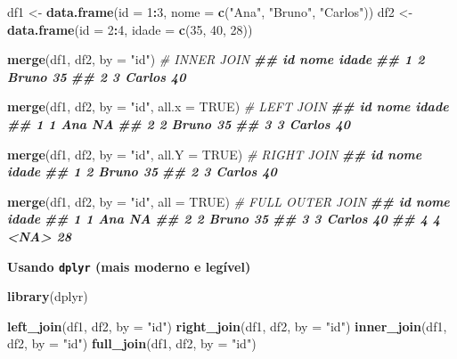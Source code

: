 \documentclass[
]{book}
\newenvironment{Shaded}{\begin{snugshade}}{\end{snugshade}}
\newcommand{\AttributeTok}[1]{\textcolor[rgb]{0.13,0.29,0.53}{#1}}
\newcommand{\CommentTok}[1]{\textcolor[rgb]{0.56,0.35,0.01}{\textit{#1}}}
\newcommand{\ConstantTok}[1]{\textcolor[rgb]{0.56,0.35,0.01}{#1}}
\newcommand{\DecValTok}[1]{\textcolor[rgb]{0.00,0.00,0.81}{#1}}
\newcommand{\DocumentationTok}[1]{\textcolor[rgb]{0.56,0.35,0.01}{\textbf{\textit{#1}}}}
\newcommand{\FunctionTok}[1]{\textcolor[rgb]{0.13,0.29,0.53}{\textbf{#1}}}
\newcommand{\NormalTok}[1]{#1}
\newcommand{\OtherTok}[1]{\textcolor[rgb]{0.56,0.35,0.01}{#1}}
\newcommand{\SpecialCharTok}[1]{\textcolor[rgb]{0.81,0.36,0.00}{\textbf{#1}}}
\newcommand{\StringTok}[1]{\textcolor[rgb]{0.31,0.60,0.02}{#1}}
\begin{document}
\begin{Shaded}
\begin{Highlighting}[]
\NormalTok{df1 }\OtherTok{\textless{}{-}} \FunctionTok{data.frame}\NormalTok{(}\AttributeTok{id =} \DecValTok{1}\SpecialCharTok{:}\DecValTok{3}\NormalTok{, }\AttributeTok{nome =} \FunctionTok{c}\NormalTok{(}\StringTok{"Ana"}\NormalTok{, }\StringTok{"Bruno"}\NormalTok{, }\StringTok{"Carlos"}\NormalTok{))}
\NormalTok{df2 }\OtherTok{\textless{}{-}} \FunctionTok{data.frame}\NormalTok{(}\AttributeTok{id =} \DecValTok{2}\SpecialCharTok{:}\DecValTok{4}\NormalTok{, }\AttributeTok{idade =} \FunctionTok{c}\NormalTok{(}\DecValTok{35}\NormalTok{, }\DecValTok{40}\NormalTok{, }\DecValTok{28}\NormalTok{))}

\FunctionTok{merge}\NormalTok{(df1, df2, }\AttributeTok{by =} \StringTok{"id"}\NormalTok{)  }\CommentTok{\# INNER JOIN}
\DocumentationTok{\#\#   id   nome idade}
\DocumentationTok{\#\# 1  2  Bruno    35}
\DocumentationTok{\#\# 2  3 Carlos    40}

\FunctionTok{merge}\NormalTok{(df1, df2, }\AttributeTok{by =} \StringTok{"id"}\NormalTok{, }\AttributeTok{all.x =} \ConstantTok{TRUE}\NormalTok{) }\CommentTok{\# LEFT JOIN}
\DocumentationTok{\#\# id   nome idade}
\DocumentationTok{\#\# 1  1    Ana    NA}
\DocumentationTok{\#\# 2  2  Bruno    35}
\DocumentationTok{\#\# 3  3 Carlos    40}

\FunctionTok{merge}\NormalTok{(df1, df2, }\AttributeTok{by =} \StringTok{"id"}\NormalTok{, }\AttributeTok{all.Y =} \ConstantTok{TRUE}\NormalTok{) }\CommentTok{\# RIGHT JOIN}
\DocumentationTok{\#\#   id   nome idade}
\DocumentationTok{\#\# 1  2  Bruno    35}
\DocumentationTok{\#\# 2  3 Carlos    40}

\FunctionTok{merge}\NormalTok{(df1, df2, }\AttributeTok{by =} \StringTok{"id"}\NormalTok{, }\AttributeTok{all =} \ConstantTok{TRUE}\NormalTok{) }\CommentTok{\# FULL OUTER JOIN}
\DocumentationTok{\#\#   id   nome idade}
\DocumentationTok{\#\# 1  1    Ana    NA}
\DocumentationTok{\#\# 2  2  Bruno    35}
\DocumentationTok{\#\# 3  3 Carlos    40}
\DocumentationTok{\#\# 4  4   \textless{}NA\textgreater{}    28}
\end{Highlighting}
\end{Shaded}

\textbf{Usando \texttt{dplyr} (mais moderno e legível)}

\begin{Shaded}
\begin{Highlighting}[]
\FunctionTok{library}\NormalTok{(dplyr)}

\FunctionTok{left\_join}\NormalTok{(df1, df2, }\AttributeTok{by =} \StringTok{"id"}\NormalTok{)}
\FunctionTok{right\_join}\NormalTok{(df1, df2, }\AttributeTok{by =} \StringTok{"id"}\NormalTok{)}
\FunctionTok{inner\_join}\NormalTok{(df1, df2, }\AttributeTok{by =} \StringTok{"id"}\NormalTok{)}
\FunctionTok{full\_join}\NormalTok{(df1, df2, }\AttributeTok{by =} \StringTok{"id"}\NormalTok{)}
\end{Highlighting}
\end{Shaded}
\end{document}

